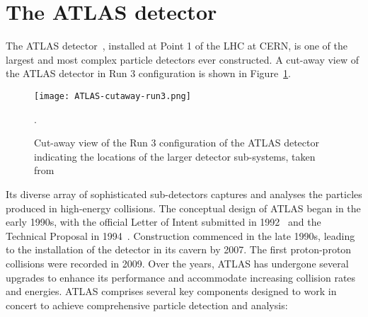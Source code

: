 \section{The ATLAS detector}
    The ATLAS detector~\cite{PERF-2007-01}, installed at Point 1 of the LHC at CERN, 
    is one of the largest and most complex particle detectors ever constructed. A cut-away 
    view of the ATLAS detector in Run 3 configuration is shown in Figure~\ref{fig:ATLAS_cutaway_run3}.
    \begin{figure}[htbp]
        \centering
        \texttt{[image: ATLAS-cutaway-run3.png]}
        \caption{Cut-away view of the Run 3 configuration of the ATLAS detector indicating the locations of the larger detector sub-systems, taken from~\cite{GENR-2019-02}}.
        \label{fig:ATLAS_cutaway_run3}
    \end{figure}
    Its diverse array of sophisticated sub-detectors captures and 
    analyses the particles produced in high-energy collisions. The conceptual design of 
    ATLAS began in the early 1990s, with the official Letter of Intent submitted 
    in 1992~\cite{ATLAS-TDR-LOI} and the Technical Proposal in 1994~\cite{ATLAS-TDR-Proposal}. 
    Construction commenced in the late 
    1990s, leading to the installation of the detector in its cavern by 2007. The 
    first proton-proton collisions were recorded in 2009. Over the years, ATLAS has undergone several 
    upgrades to enhance its performance and accommodate increasing collision 
    rates and energies. ATLAS comprises several key components designed to work in concert to achieve 
    comprehensive particle detection and analysis:
